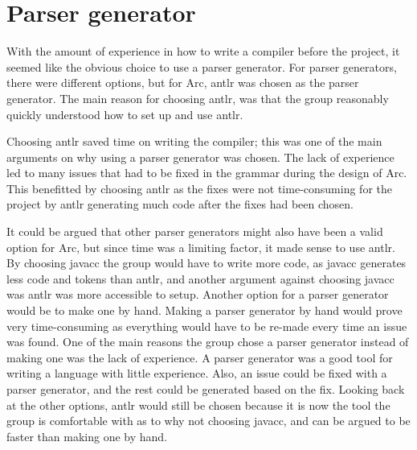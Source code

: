 
\section{Parser generator}
With the amount of experience in how to write a compiler before the project, it seemed like the obvious choice to use a parser generator. For parser generators, there were different options, but for Arc, \gls{antlr} was chosen as the parser generator. The main reason for choosing \gls{antlr}, was that the group reasonably quickly understood how to set up and use \gls{antlr}. 


Choosing \gls{antlr} saved time on writing the compiler; this was one of the main arguments on why using a parser generator was chosen. The lack of experience led to many issues that had to be fixed in the grammar during the design of Arc. This benefitted by choosing \gls{antlr} as the fixes were not time-consuming for the project by \gls{antlr} generating much code after the fixes had been chosen. 


It could be argued that other parser generators might also have been a valid option for Arc, but since time was a limiting factor, it made sense to use \gls{antlr}. By choosing \gls{javacc} the group would have to write more code, as \gls{javacc} generates less code and tokens than \gls{antlr}, and another argument against choosing \gls{javacc} was \gls{antlr} was more accessible to setup. Another option for a parser generator would be to make one by hand. Making a parser generator by hand would prove very time-consuming as everything would have to be re-made every time an issue was found. One of the main reasons the group chose a parser generator instead of making one was the lack of experience. A parser generator was a good tool for writing a language with little experience. Also, an issue could be fixed with a parser generator, and the rest could be generated based on the fix. Looking back at the other options, \gls{antlr} would still be chosen because it is now the tool the group is comfortable with as to why not choosing \gls{javacc}, and can be argued to be faster than making one by hand.

